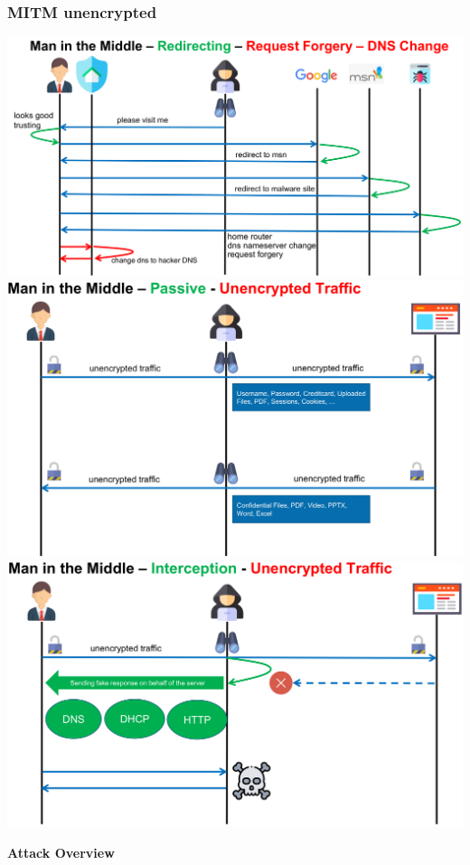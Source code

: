 \subsubsection{MITM unencrypted}
\begin{center}
\includegraphics[width=\textwidth]{resources/07-mitm-request-forgery.png}
\includegraphics[width=\textwidth]{resources/07-mitm-passive-unencrypted.png}
\includegraphics[width=\textwidth]{resources/07-mitm-passive-unencrypted-2.png}
\end{center}
\textbf{Attack Overview}

